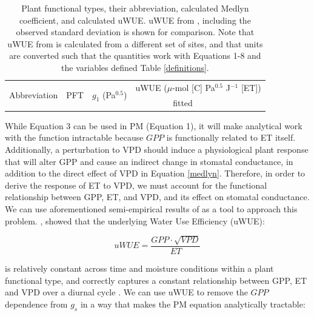 \documentclass[draft,linenumbers]{agujournal}
\begin{document}
\begin{table}
  \caption{Plant functional types, their abbreviation, calculated Medlyn coefficient, and calculated uWUE. uWUE from \citet{Zhou_2015}, including the  observed standard deviation is shown for comparison. Note that uWUE from \citet{Zhou_2015} is calculated from a different set of sites, and that units are converted such that the quantities work with Equations 1-8 and the variables defined Table \ref{definitions}.}
    \small
\label{pft}
\centering
\begin{tabular}{l c c @{\qquad} c c}
  \hline
  \multirow{2}[3]{*}{Abbreviation} & \multirow{2}[3]{*}{PFT} & \multirow{2}[3]{*}{$g_1$ (Pa$^{0.5}$)} & \multicolumn{2}{c}{uWUE ($\mu$-mol [C] Pa$^{0.5}$ J$^{-1}$ [ET])}  \\
  \cmidrule{4-5}

  & & & fitted & \citet{Zhou_2015} \\

  \hline

  \hline
\end{tabular}
\end{table}

While Equation 3 can be used in PM (Equation 1), it will make analytical work with the function intractable because $GPP$ is functionally related to ET itself. Additionally, a perturbation to VPD should induce a physiological plant response that will alter GPP and cause an indirect change in stomatal conductance, in addition to the direct effect of VPD in Equation \ref{medlyn}. Therefore, in order to derive the response of ET to VPD, we must account for the functional relationship between GPP, ET, and VPD, and its effect on stomatal conductance. We can use aforementioned semi-empirical results of \citet{Zhou_2015} as a tool to approach this problem. \citet{Zhou_2015}, showed that the underlying Water Use Efficiency (uWUE):

\begin{linenomath*}
  \begin{equation}
    uWUE = \frac{GPP \cdot \sqrt{VPD}}{ET}
    \label{uwue}
  \end{equation}
\end{linenomath*}

is relatively constant across time and moisture conditions within a plant functional type, and correctly captures a constant relationship between GPP, ET and VPD over a diurnal cycle \citep{Zhou_2014}. We can use uWUE to remove the $GPP$ dependence from $g_s$ in a way that makes the PM equation analytically tractable:
\end{document}
